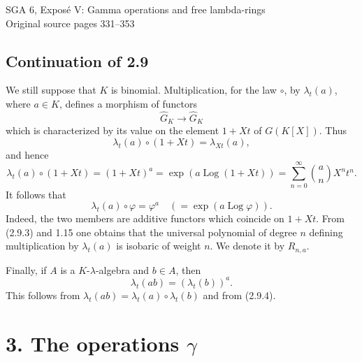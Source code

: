 \documentclass[11pt]{article}
\newcommand{\Fil}{\operatorname{Fil}}
\providecommand{\eps}{\varepsilon}
\begin{document}
\providecommand{\Ghat}{\widehat G}
\providecommand{\Gg}{\widehat G_g}
\providecommand{\Gcirc}{\widehat G_{\circ}}
\providecommand{\Gnabla}{\widehat G_{\nabla}}
\providecommand{\Grhat}{\widehat{\operatorname{Gr}}}
\providecommand{\Log}{\operatorname{Log}}
\providecommand{\Fil}{\operatorname{Fil}}
\providecommand{\eps}{\varepsilon}
\providecommand{\id}{\operatorname{id}}
\providecommand{\Sym}{\operatorname{Sym}}
\providecommand{\Mon}{\operatorname{Mon}}

\begin{center}
{\Large SGA 6, Exposé V: Gamma operations and free lambda-rings}\\[0.3em]
{\large Original source pages 331--353}
\end{center}


\subsection*{Continuation of 2.9}

We still suppose that \(K\) is binomial. Multiplication, for the law \(\circ\), by \(\lambda_t(a)\), where \(a\in K\), defines a morphism of functors
\[
  \Ghat_K\longrightarrow \Ghat_K
\]
which is characterized by its value on the element \(1+Xt\) of \(G(K[X])\). Thus
\[
  \lambda_t(a)\circ(1+Xt)=\lambda_{Xt}(a),
\]
and hence
\begin{equation}\tag{2.9.3}
  \lambda_t(a)\circ(1+Xt)
  =(1+Xt)^a
  =\exp(a\Log(1+Xt))
  =\sum_{n=0}^{\infty}\binom{a}{n}X^nt^n .
\end{equation}
It follows that
\begin{equation}\tag{2.9.4}
  \lambda_t(a)\circ\varphi=\varphi^a
  \quad(=\exp(a\Log\varphi)).
\end{equation}
Indeed, the two members are additive functors which coincide on \(1+Xt\). From (2.9.3) and 1.15 one obtains that the universal polynomial of degree \(n\) defining multiplication by \(\lambda_t(a)\) is isobaric of weight \(n\). We denote it by \(R_{n,a}\).

Finally, if \(A\) is a \(K\)-\(\lambda\)-algebra and \(b\in A\), then
\begin{equation}\tag{2.9.5}
  \lambda_t(ab)=(\lambda_t(b))^a .
\end{equation}
This follows from \(\lambda_t(ab)=\lambda_t(a)\circ\lambda_t(b)\) and from (2.9.4).

\section*{3. The operations \(\gamma\)}
\end{document}
